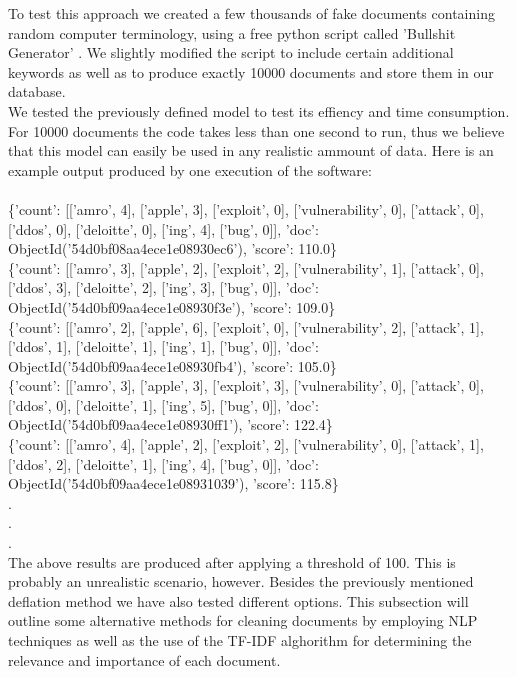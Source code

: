 \documentclass[12pt]{article}
\newcounter{subsubsubsection}[subsubsection]
\begin{document}
To test this approach we created a few thousands of fake documents containing random computer terminology, using a free python script called 'Bullshit Generator' \cite{bullgen}. We slightly modified the script to include certain additional keywords as well as to produce exactly 10000 documents and store them in our database. 
\hfill \break\\
We tested the previously defined model to test its effiency and time consumption. For 10000 documents the code takes less than one second to run, thus we believe that this model can easily be used in any realistic ammount of data. Here is an example output produced by one execution of the software:\\\\
\{'count': [['amro', 4], ['apple', 3], ['exploit', 0], ['vulnerability', 0], ['attack', 0], ['ddos', 0], ['deloitte', 0], ['ing', 4], ['bug', 0]], 'doc': ObjectId('54d0bf08aa4ece1e08930ec6'), 'score': 110.0\}\\
\{'count': [['amro', 3], ['apple', 2], ['exploit', 2], ['vulnerability', 1], ['attack', 0], ['ddos', 3], ['deloitte', 2], ['ing', 3], ['bug', 0]], 'doc': ObjectId('54d0bf09aa4ece1e08930f3e'), 'score': 109.0\}\\
\{'count': [['amro', 2], ['apple', 6], ['exploit', 0], ['vulnerability', 2], ['attack', 1], ['ddos', 1], ['deloitte', 1], ['ing', 1], ['bug', 0]], 'doc': ObjectId('54d0bf09aa4ece1e08930fb4'), 'score': 105.0\}\\
\{'count': [['amro', 3], ['apple', 3], ['exploit', 3], ['vulnerability', 0], ['attack', 0], ['ddos', 0], ['deloitte', 1], ['ing', 5], ['bug', 0]], 'doc': ObjectId('54d0bf09aa4ece1e08930ff1'), 'score': 122.4\}\\
\{'count': [['amro', 4], ['apple', 2], ['exploit', 2], ['vulnerability', 0], ['attack', 1], ['ddos', 2], ['deloitte', 1], ['ing', 4], ['bug', 0]], 'doc': ObjectId('54d0bf09aa4ece1e08931039'), 'score': 115.8\}\\
.\\
.\\
.\\
\hfill \break
The above results are produced after applying a threshold of 100. This is probably an unrealistic scenario, however. 
Besides the previously mentioned deflation method we have also tested different options. This subsection will outline some alternative methods for cleaning documents by employing NLP techniques as well as the use of the TF-IDF alghorithm for determining the relevance and importance of each document.
\end{document}
